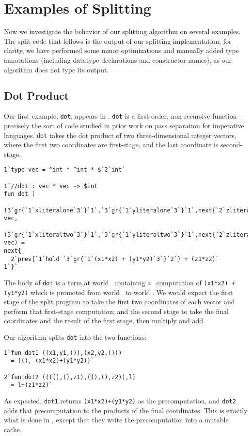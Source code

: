  \section{Examples of Splitting}
\label{sec:examples}

Now we investigate the behavior of our splitting algorithm on several examples.
The split code that follows is the output of our splitting implementation; for
clarity, we have performed some minor optimizations and manually added type
annotations (including datatype declarations and constructor names), as our
algorithm does not type its output.

\subsection{Dot Product}

Our first example, \texttt{dot}, appears in \cite{knoblock96}. \texttt{dot} is a
first-order, non-recursive function---precisely the sort of code studied in
prior work on pass separation for imperative languages. \texttt{dot} takes the
dot product of two three-dimensional integer vectors, where the first two
coordinates are first-stage, and the last coordinate is second-stage. 
%
\begin{lstlisting} 
1`type vec = ^int * ^int * $`2`int`

1`//dot : vec * vec -> $int
fun dot (
  (3`gr{`1`xliteralone`3`}`1`,`3`gr{`1`yliteralone`3`}`1`,next{`2`zliteralone`1`}): vec,
  (3`gr{`1`xliteraltwo`3`}`1`,`3`gr{`1`yliteraltwo`3`}`1`,next{`2`zliteraltwo`1`}): vec) = 
next{
  2`prev{`1`hold `3`gr{`1`(x1*x2) + (y1*y2)`3`}`2`} + (z1*z2)`
1`}`
\end{lstlisting}
%
The body of \texttt{dot} is a \rmint{} term at world \bbtwo\ containing a
\rmint\ computation of \texttt{(x1*x2) + (y1*y2)} which is promoted from world
\bbonep\ to world \bbtwo. We would expect the first stage of the split program
to take the first two coordinates of each vector and perform that first-stage
computation; and the second stage to take the final coordinates and the result
of the first stage, then multiply and add.

Our algorithm splits \texttt{dot} into the two functions:
%
\begin{lstlisting} 
1`fun dot1 ((x1,y1,()),(x2,y2,())) 
  = ((), (x1*x2)+(y1*y2))`

2`fun dot2 ((((),(),z1),((),(),z2)),l) 
  = l+(z1*z2)`
\end{lstlisting}
%
As expected, \texttt{dot1} returns \texttt{(x1*x2)+(y1*y2)} as the
precomputation, and \texttt{dot2} adds that precomputation to the products of
the final coordinates. This is exactly what is done in \cite{knoblock96}, except
that they write the precomputation into a mutable cache.

